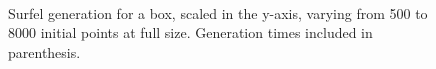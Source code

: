 \begin{figure}[h!]
   \\
   \captionfonts
   \caption[Box surfels at full size]{Surfel generation for a box, scaled in the y-axis, varying from 500 to 8000 initial points at full size. Generation times included in parenthesis.}
   \label{fig:box_surfels}
\end{figure}

